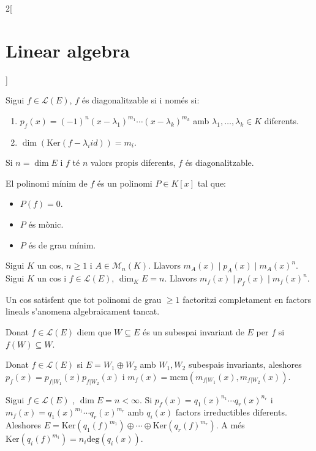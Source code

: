 \documentclass[class=article,10pt,crop=false]{standalone}
\begin{document}
\begin{multicols}{2}[\section{Linear algebra}]
\begin{theorem}
Sigui $f\in\mathcal{L}(E)$, $f$ és diagonalitzable si i només si:
\begin{enumerate}
    \item $p_f(x)=(-1)^n(x-\lambda_1)^{m_1}\cdots(x-\lambda_k)^{m_k}$ amb $\lambda_1,\ldots,\lambda_k\in K$ diferents.
    \item $\dim(\text{Ker}(f-\lambda_i id))=m_i$.
\end{enumerate}
\end{theorem}
\begin{corollary}
Si $n=\dim E$ i $f$ té $n$ valors propis diferents, $f$ és diagonalitzable.
\end{corollary}
\begin{definition}
El polinomi mínim de $f$ és un polinomi $P\in K[x]$ tal que:
\begin{itemize}
    \item $P(f)=0$.
    \item $P$ és mònic.
    \item $P$ és de grau mínim.
\end{itemize}
\end{definition}
\begin{theorem}
Sigui $K$ un cos, $n\geq 1$ i $A\in\mathcal{M}_n(K)$. Llavors $m_A(x)\mid p_A(x)\mid m_A(x)^n$. Sigui $K$ un cos i $f\in\mathcal{L}(E)$, $\dim_K E=n$. Llavors $m_f(x)\mid p_f(x)\mid m_f(x)^n$. 
\end{theorem}
\begin{definition}
Un cos satisfent que tot polinomi de grau $\geq 1$ factoritzi completament en factors lineals s'anomena algebraicament tancat.
\end{definition}
\begin{definition}
Donat $f\in\mathcal{L}(E)$ diem que $W\subseteq E$ és un subespai invariant de $E$ per $f$ si $f(W)\subseteq W$.
\end{definition}
\begin{lemma}
Donat $f\in\mathcal{L}(E)$ si $E=W_1\oplus W_2$ amb $W_1,W_2$ subespais invariants, aleshores $p_f(x)=p_{f|W_1}(x)p_{f|W_2}(x)$ i $m_f(x)=\text{mcm}(m_{f|W_1}(x),m_{f|W_2}(x))$.
\end{lemma}
\begin{theorem}
Sigui $f\in\mathcal{L}(E)$ , $\dim E=n<\infty$. Si $p_f(x)=q_1(x)^{n_1}\cdots q_r(x)^{n_r}$ i $m_f(x)=q_1(x)^{m_1}\cdots q_r(x)^{m_r}$ amb $q_i(x)$ factors irreductibles diferents. Aleshores $E=\text{Ker}(q_1(f)^{m_1})\oplus\cdots\oplus\text{Ker}(q_r(f)^{m_r})$. A més $\text{Ker}(q_i(f)^{m_i})=n_i\text{deg}(q_i(x))$.

\end{theorem}
\end{multicols}
\end{document}
